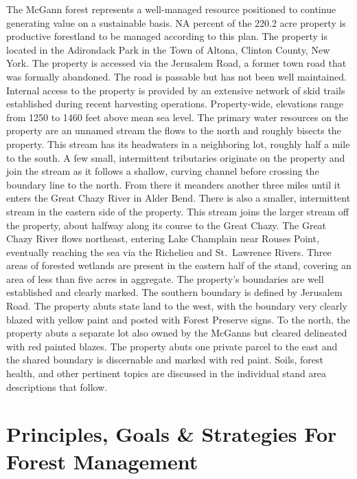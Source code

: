 \documentclass[]{tufte-handout}
\begin{document}
The McGann forest represents a well-managed resource positioned to
continue generating value on a sustainable basis. NA percent of the
220.2 acre property is productive forestland to be managed according to
this plan. The property is located in the Adirondack Park in the Town of
Altona, Clinton County, New York. The property is accessed via the
Jerusalem Road, a former town road that was formally abandoned. The road
is passable but has not been well maintained. Internal access to the
property is provided by an extensive network of skid trails established
during recent harvesting operations. Property-wide, elevations range
from 1250 to 1460 feet above mean sea level. The primary water resources
on the property are an unnamed stream the flows to the north and roughly
bisects the property. This stream has its headwaters in a neighboring
lot, roughly half a mile to the south. A few small, intermittent
tributaries originate on the property and join the stream as it follows
a shallow, curving channel before crossing the boundary line to the
north. From there it meanders another three miles until it enters the
Great Chazy River in Alder Bend. There is also a smaller, intermittent
stream in the eastern side of the property. This stream joins the larger
stream off the property, about halfway along its course to the Great
Chazy. The Great Chazy River flows northeast, entering Lake Champlain
near Rouses Point, eventually reaching the sea via the Richelieu and
St.~Lawrence Rivers. Three areas of forested wetlands are present in the
eastern half of the stand, covering an area of less than five acres in
aggregate. The property's boundaries are well established and clearly
marked. The southern boundary is defined by Jerusalem Road. The property
abuts state land to the west, with the boundary very clearly blazed with
yellow paint and posted with Forest Preserve signs. To the north, the
property abuts a separate lot also owned by the McGanns but cleared
delineated with red painted blazes. The property abuts one private
parcel to the east and the shared boundary is discernable and marked
with red paint. Soils, forest health, and other pertinent topics are
discussed in the individual stand area descriptions that follow.

\section{Principles, Goals \& Strategies For Forest
Management}\label{principles-goals-strategies-for-forest-management}
\end{document}
